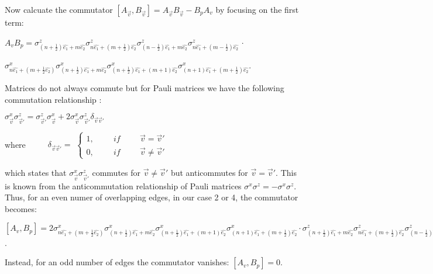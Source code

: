 \documentclass{Configuration_Files/PoliMi3i_thesis}
\begin{document}
Now calcuate the commutator $[A_{\vec{v}},B_{\vec{v}}] = A_{\vec{v}}B_{\vec{v}} - B_{p}A_{v}$ by focusing on the first term: \newline

\begin{center}
	
	$ A_{v}B_{p} =
	\sigma^z_{(n+\frac{1}{2})\hat{e_1} + m\hat{e_2}} \sigma^z_{n\hat{e_1}+(m+\frac{1}{2})\hat{e_2}} \sigma^z_{(n-\frac{1}{2})\hat{e_1} + m\hat{e_2}} \sigma^z_{n\hat{e_1}+(m-\frac{1}{2})\hat{e_2}} $ $\cdot$
	
	$\sigma^x_{n\hat{e_1} + (m+\frac{1}{2}\hat{e_2})} \sigma^x_{(n+ \frac{1}{2})\hat{e_1} + m\hat{e_2}} \sigma^x_{(n+ \frac{1}{2})\hat{e_1} + (m + 1)\hat{e_2}} \sigma^x_{(n+ 1)\hat{e_1} + (m + \frac{1}{2})\hat{e_2}}$. \newline
	
\end{center}


Matrices do not always commute but for Pauli matrices we have the following commutation relationship :
\newline

\begin{center}
	$\sigma^x_{\vec{v}}\sigma^z_{\vec{v}'} = \sigma^z_{\vec{v}'} \sigma^x_{\vec{v}} + 2 \sigma^x_{\vec{v}}\sigma^z_{\vec{v}'} \delta_{\vec{v} \vec{v}'}$\newline
\end{center}

where $\hspace{1cm} \delta_{\vec{v} \vec{v}'} =$
$\begin{cases}
	1, \hspace{1cm} if \hspace{1cm}  \vec{v} = \vec{v}'\\
	0, \hspace{1cm} if \hspace{1cm} \vec{v} \neq \vec{v}'
\end{cases}$\newline

which states that 	$\sigma^x_{\vec{v}}\sigma^z_{\vec{v}'}$ commutes for $\vec{v} \neq \vec{v}'$   but anticommutes for $\vec{v} = \vec{v}'$. This is known from the anticommutation relationship of Pauli matrices $\sigma^x \sigma^z = - \sigma^x \sigma^z$. Thus, for an even numer of overlapping edges, in our case 2 or 4, the commutator becomes:\newline

\begin{center}
	
	$[A_{v},B_{p}] = 2
	\sigma^x_{n\hat{e_1} + (m+\frac{1}{2}\hat{e_2})} \sigma^x_{(n+ \frac{1}{2})\hat{e_1} + m\hat{e_2}} \sigma^x_{(n+ \frac{1}{2})\hat{e_1} + (m + 1)\hat{e_2}} \sigma^x_{(n+ 1)\hat{e_1} + (m + \frac{1}{2})\hat{e_2}} \cdot
	\sigma^z_{(n+\frac{1}{2})\hat{e_1} + m\hat{e_2}} \sigma^z_{n\hat{e_1}+(m+\frac{1}{2})\hat{e_2}} \sigma^z_{(n-\frac{1}{2})\hat{e_1} + m\hat{e_2}} \sigma^z_{n\hat{e_1}+(m-\frac{1}{2})\hat{e_2}} $. \newline

\end{center}
Instead, for an odd number of edges the commutator vanishes: $[A_{v},B_{p}]=0$.
\end{document}
